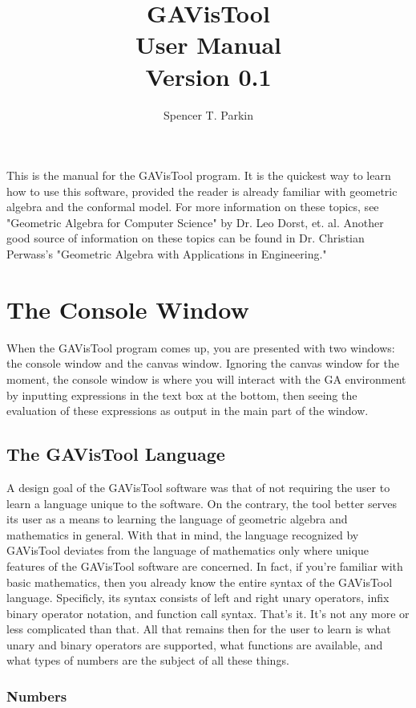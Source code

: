 \documentclass[12pt]{article}
\title{GAVisTool\\User Manual\\Version 0.1}
\author{Spencer T. Parkin}
\begin{document}
\maketitle

This is the manual for the GAVisTool program.  It is the quickest way to learn
how to use this software, provided the reader is already familiar with geometric
algebra and the conformal model.  For more information on these topics, see
"Geometric Algebra for Computer Science" by Dr. Leo Dorst, et. al.  Another good
source of information on these topics can be found in Dr. Christian Perwass's "Geometric
Algebra with Applications in Engineering."

\section{The Console Window}

When the GAVisTool program comes up, you are presented with two windows: the console
window and the canvas window.  Ignoring the canvas window for the moment, the console
window is where you will interact with the GA environment by inputting expressions in the
text box at the bottom, then seeing the evaluation of these expressions as output in the
main part of the window.

\subsection{The GAVisTool Language}

A design goal of the GAVisTool software was that of not requiring the user to learn a language
unique to the software.  On the contrary, the tool better serves its user as a means to learning
the language of geometric algebra and mathematics in general.  With that in mind, the language
recognized by GAVisTool deviates from the language of mathematics only where unique features
of the GAVisTool software are concerned.  In fact, if you're familiar with basic mathematics, then
you already know the entire syntax of the GAVisTool language.  Specificly,
its syntax consists of left and right unary operators, infix binary operator notation,
and function call syntax.  That's it.  It's not any more or less complicated than that.  All that
remains then for the user to learn is what unary and binary operators are supported,
what functions are available, and what types of numbers are the subject of all these things.

\subsubsection{Numbers}
\end{document}

